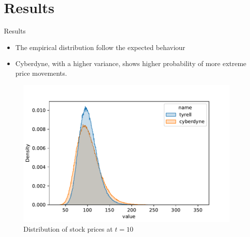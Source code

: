 \documentclass[9pt]{beamer}
\begin{document}
\section{Results}
\begin{frame}{Results}
\begin{itemize}

  \setlength\itemsep{1em}  %
  
    \item The empirical distribution follow the expected behaviour
    
    \item Cyberdyne, with a higher variance, shows higher probability of more extreme price movements.
\end{itemize}
\begin{figure}[h]

\centering
\includegraphics[scale=0.5]{hist.pdf}
\caption{Distribution of stock prices at $t=10$}
\label{plot}
\end{figure}
\end{frame}

    
\end{document}
